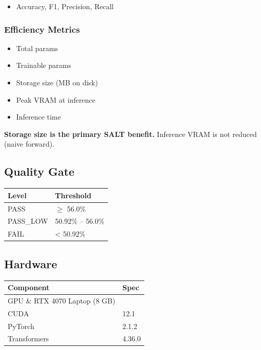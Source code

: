 \begin{itemize}
\item Accuracy, F1, Precision, Recall

\end{itemize}
\subsubsection{Efficiency Metrics}

\begin{itemize}
\item Total params
\item Trainable params
\item Storage size (MB on disk)
\item Peak VRAM at inference
\item Inference time

\end{itemize}
\textbf{Storage size is the primary SALT benefit.} Inference VRAM is not reduced 
(naive forward).

\subsection{Quality Gate}

\begin{table}[H]
\centering
\small
\begin{tabular}{ll}
\toprule
\textbf{Level} & \textbf{Threshold} \\
\midrule
PASS & $\ge$ 56.0\% \\
PASS\_LOW & 50.92\% -- 56.0\% \\
FAIL & \textless{} 50.92\% \\
\bottomrule
\end{tabular}
\end{table}

\subsection{Hardware}

\begin{table}[H]
\centering
\small
\begin{tabular}{ll}
\toprule
\textbf{Component} & \textbf{Spec} \\
\midrule
GPU \& RTX 4070 Laptop (8 GB) \\
CUDA & 12.1 \\
PyTorch & 2.1.2 \\
Transformers & 4.36.0 \\
\bottomrule
\end{tabular}
\end{table}

